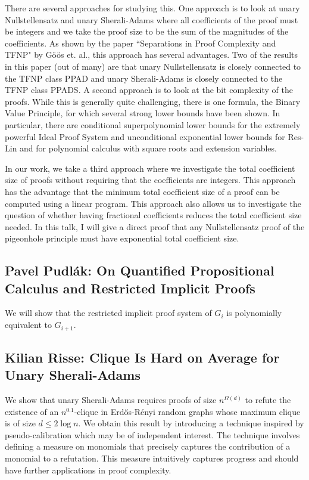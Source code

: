 \documentclass[11pt]{article}
\begin{document}
There are several approaches for studying this. One approach is to look at unary Nullstellensatz and unary Sherali-Adams where all coefficients of the proof must be integers and we take the proof size to be the sum of the magnitudes of the coefficients. As shown by the paper ``Separations in Proof Complexity and TFNP" by Göös et. al., this approach has several advantages. Two of the results in this paper (out of many) are that unary Nullstellensatz is closely connected to the TFNP class PPAD and unary Sherali-Adams is closely connected to the TFNP class PPADS. A second approach is to look at the bit complexity of the proofs. While this is generally quite challenging, there is one formula, the Binary Value Principle, for which several strong lower bounds have been shown. In particular, there are conditional superpolynomial lower bounds for the extremely powerful Ideal Proof System and unconditional exponential lower bounds for Res-Lin and for polynomial calculus with square roots and extension variables.

In our work, we take a third approach where we investigate the total coefficient size of proofs without requiring that the coefficients are integers. This approach has the advantage that the minimum total coefficient size of a proof can be computed using a linear program. This approach also allows us to investigate the question of whether having fractional coefficients reduces the total coefficient size needed. In this talk, I will give a direct proof that any Nullstellensatz proof of the pigeonhole principle must have exponential total coefficient size. 



\subsection*{Pavel Pudl\'{a}k: On Quantified Propositional Calculus and Restricted Implicit Proofs}\label{Pudlak}

We will show that the restricted implicit proof system of $G_i$ is
polynomially equivalent to $G_{i+1}$.

\subsection*{Kilian Risse: Clique Is Hard on Average for Unary Sherali-Adams}\label{Risse}

We show that unary Sherali-Adams requires proofs of size $n^{\Omega(d)}$
to refute the existence of an $n^{0.1}$-clique in Erd\H{o}s-R\'{e}nyi
random graphs whose maximum clique is of size  $d\leq 2\log n$. We
obtain this result by introducing a technique inspired by
pseudo-calibration which may be of independent interest. The technique
involves defining a measure on monomials that precisely captures the
contribution of a monomial to a refutation. This measure intuitively
captures progress and should have further applications in proof complexity.
\end{document}

